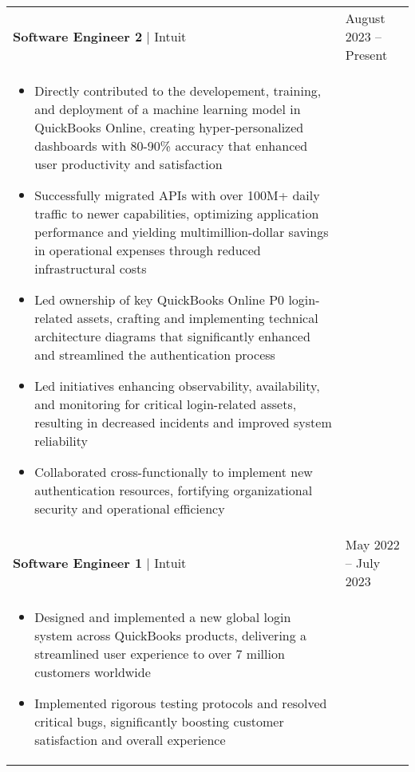 \documentclass[11pt]{article}
\newenvironment{compactList}
{
  \begin{itemize}
    \setlength{\itemsep}{0pt}
    \setlength{\parskip}{0pt}
}
{\end{itemize}}
\begin{document}
\begin{tabularx}{\textwidth\setlength{\extrarowheight}{5pt}}
  {
    >{\hsize=1.5\hsize\raggedright\arraybackslash}X
    >{\hsize=0.5\hsize\raggedleft\arraybackslash}X
  }
  \textbf{Software Engineer 2} $\vert$ Intuit                            & August 2023 – Present     \\
  \multicolumn{2}{>{\hsize=\dimexpr2\hsize+2\tabcolsep+\arrayrulewidth\relax}X}
  {
    \begin{minipage}{0.85\paperwidth}
      \begin{compactList}
        \item Directly contributed to the developement, training, and deployment of a machine learning model in QuickBooks Online, creating hyper-personalized dashboards with 80-90\% accuracy that enhanced user productivity and satisfaction
        \item Successfully migrated APIs with over 100M+ daily traffic to newer capabilities, optimizing application performance and yielding multimillion-dollar savings in operational expenses through reduced infrastructural costs
        \item Led ownership of key QuickBooks Online P0 login-related assets, crafting and implementing technical architecture diagrams that significantly enhanced and streamlined the authentication process
        \item Led initiatives enhancing observability, availability, and monitoring for critical login-related assets, resulting in decreased incidents and improved system reliability
        \item Collaborated cross-functionally to implement new authentication resources, fortifying organizational security and operational efficiency
      \end{compactList}
    \end{minipage}
  }
  \\
  \textbf{Software Engineer 1} $\vert$ Intuit                            & May 2022 – July 2023     \\
  \multicolumn{2}{>{\hsize=\dimexpr2\hsize+2\tabcolsep+\arrayrulewidth\relax}X}
  {
    \begin{minipage}{0.85\paperwidth}
      \begin{compactList}
        \item Designed and implemented a new global login system across QuickBooks products, delivering a streamlined user experience to over 7 million customers worldwide
        \item Implemented rigorous testing protocols and resolved critical bugs, significantly boosting customer satisfaction and overall experience

\end{compactList}
\end{minipage}}
\end{tabularx}
\end{document}
